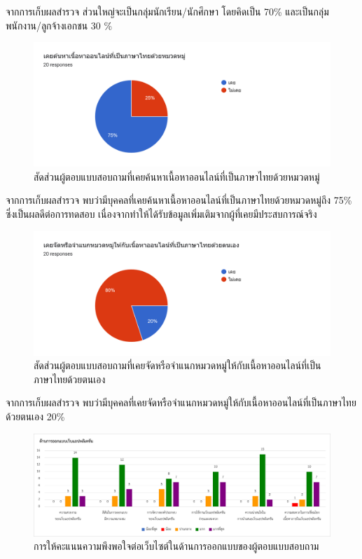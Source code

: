 \documentclass[12pt,oneside,openright,a4paper]{cpe-thai-project}
\begin{document}
      \hspace{1cm}จากการเก็บผลสำรวจ ส่วนใหญ่จะเป็นกลุ่มนักเรียน/นักศึกษา โดยคิดเป็น 70\% และเป็นกลุ่มพนักงาน/ลูกจ้างเอกชน 30 \%
      \begin{figure}[!ht]\centering
        \includegraphics[width=\textwidth]{./img/test/search.png}
        \caption{สัดส่วนผู้ตอบแบบสอบถามที่เคยค้นหาเนื้อหาออนไลน์ที่เป็นภาษาไทยด้วยหมวดหมู่}\label{fig:user_test_search}
      \end{figure}
      
      \hspace{1cm}จากการเก็บผลสำรวจ พบว่ามีบุคคลที่เคยค้นหาเนื้อหาออนไลน์ที่เป็นภาษาไทยด้วยหมวดหมู่ถึง 75\% 
      ซึ่งเป็นผลดีต่อการทดสอบ เนื่องจากทำให้ได้รับข้อมูลเพิ่มเติมจากผู้ที่เคยมีประสบการณ์จริง
      \newpage
      \begin{figure}[!ht]\centering
        \includegraphics[width=\textwidth]{./img/test/tag.png}
        \caption{สัดส่วนผู้ตอบแบบสอบถามที่เคยจัดหรือจำแนกหมวดหมู่ให้กับเนื้อหาออนไลน์ที่เป็นภาษาไทยด้วยตนเอง}\label{fig:user_test_tag}
      \end{figure}
      
      \hspace{1cm}จากการเก็บผลสำรวจ พบว่ามีบุคคลที่เคยจัดหรือจำแนกหมวดหมู่ให้กับเนื้อหาออนไลน์ที่เป็นภาษาไทยด้วยตนเอง 20\% 
      
      \begin{figure}[!ht]\centering
        \includegraphics[width=\textwidth]{./img/test/design.png}
        \caption{การให้คะแนนความพึงพอใจต่อเว็บไซต์ในด้านการออกแบบของผู้ตอบแบบสอบถาม}\label{fig:user_test_design}
      \end{figure}
\end{document}
